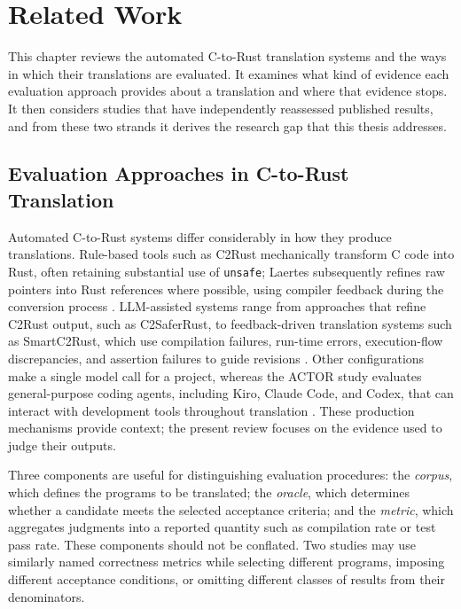 \chapter{Related Work}
\label{ch:related-work}

This chapter reviews the automated C-to-Rust translation systems and the ways in which their translations are evaluated. It examines what kind of evidence each evaluation approach provides about a translation and where that evidence stops. It then considers studies that have independently reassessed published results, and from these two strands it derives the research gap that this thesis addresses.

\section{Evaluation Approaches in C-to-Rust Translation}
\label{sec:rw-approaches}\label{sec:rw-translation}

Automated C-to-Rust systems differ considerably in how they produce
translations. Rule-based tools such as C2Rust mechanically transform C
code into Rust, often retaining substantial use of \texttt{unsafe};
Laertes subsequently refines raw pointers into Rust references where
possible, using compiler feedback during the conversion process
\cite{c2rust,emre2021laertes}. LLM-assisted systems range from
approaches that refine C2Rust output, such as C2SaferRust, to
feedback-driven translation systems such as SmartC2Rust, which use
compilation failures, run-time errors, execution-flow discrepancies, and
assertion failures to guide revisions
\cite{nitin2025c2saferrust,shiraishi2026smartc2rust}. Other
configurations make a single model call for a project, whereas the ACTOR
study evaluates general-purpose coding agents, including Kiro, Claude
Code, and Codex, that can interact with development tools throughout
translation \cite{schesch2026actor}. These production mechanisms provide context; the present review focuses on the evidence used to judge their outputs.

Three components are useful for distinguishing evaluation procedures:
the \emph{corpus}, which defines the programs to be translated; the
\emph{oracle}, which determines whether a candidate meets the selected
acceptance criteria; and the \emph{metric}, which aggregates judgments
into a reported quantity such as compilation rate or test pass rate.
These components should not be conflated. Two studies may use similarly
named correctness metrics while selecting different programs, imposing
different acceptance conditions, or omitting different classes of
results from their denominators.

